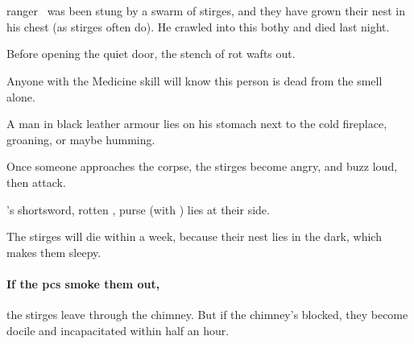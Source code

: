 \subsubsection{\composeHumanName\ }

\Gls{ranger} \composeHumanName\ was been stung by a swarm of stirges, and they have grown their nest in his chest (as stirges often do).
He crawled into this \gls{bothy} and died last night.

\begin{boxtext}
  Before opening the quiet door, the stench of rot wafts out.
\end{boxtext}

Anyone with the Medicine \gls{skill} will know this person is dead from the smell alone.

\begin{boxtext}
  A man in black leather armour lies on his stomach next to the cold fireplace, groaning, or maybe humming.
\end{boxtext}

Once someone approaches the corpse, the stirges become angry, and buzz loud, then attack.

\currentName's shortsword, rotten \rations, purse (with \lootMedium) lies at their side.

\stirgeSwarm

The stirges will die within a week, because their nest lies in the dark, which makes them sleepy.

\paragraph{If the \glspl{pc} smoke them out,}
the stirges leave through the chimney.
But if the chimney's blocked, they become docile and incapacitated within half an hour.

